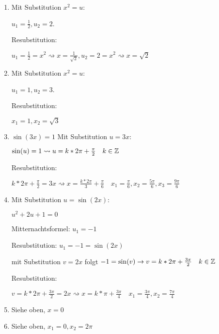 \begin{lsg}{}
	\begin{enumerate}
    \item Mit Substitution $x^2=u$:

		$u_1=\frac 1 2, u_2=2$.

		Resubstitution:

		$u_1=\frac 1 2 = x^2 \rightsquigarrow x=\frac 1{\sqrt 2},  u_2=2 = x^2 \rightsquigarrow x=\sqrt 2$
    \item Mit Substitution $x^2=u$:

		$u_1=1, u_2=3$.

		Resubstitution:

		$x_1=1, x_2=\sqrt 3$
    \item $\sin(3x) = 1$
		Mit Substitution $u=3x$:

		$\sin(u)=1 \rightsquigarrow u=k*2\pi+\frac {\pi} 2 \quad k\in\mathbb{Z}$

		Resubstitution:

		$k*2\pi+\frac {\pi} 2 = 3x \rightsquigarrow x=\frac {k*2\pi} 3+\frac {\pi} 6\quad x_1=\frac \pi 6, x_2=\frac {5\pi} 6, x_3=\frac{9\pi} 6$
    \item Mit Substitution $u=\sin(2x)$:

		$u^2 + 2u + 1 = 0$

		Mitternachtsformel: $u_1=-1$

		Resubstitution: $u_1=-1=\sin(2x)$

		mit Substitution $v=2x$ folgt $-1=\sin(v) \rightarrow v=k*2\pi+\frac {3\pi} 2 \quad k\in\mathbb{Z}$

		Resubstitution:

		$v=k*2\pi+\frac {3\pi} 2=2x \rightsquigarrow x=k*\pi+\frac {3\pi} 4 \quad x_1=\frac {3\pi} 4, x_2=\frac {7\pi} 4$
    \item Siehe oben, $x=0$
		\item Siehe oben, $x_1=0,x_2=2\pi$
  \end{enumerate}
\end{lsg}


